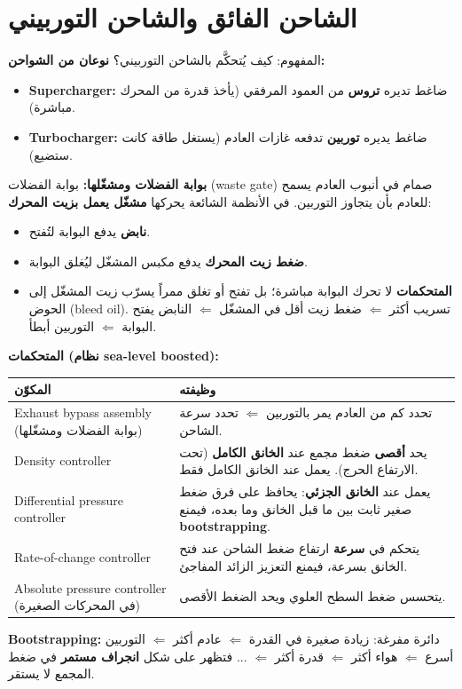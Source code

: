 \documentclass[11pt,a4paper]{article}
\newcommand{\en}[1]{\textenglish{#1}}
\begin{document}
\newpage
\section{الشاحن الفائق والشاحن التوربيني}

\begin{concept}{المفهوم: كيف يُتحكَّم بالشاحن التوربيني؟}
\textbf{نوعان من الشواحن:}
\begin{itemize}
  \item \textbf{\en{Supercharger}:} ضاغط تديره \textbf{تروس} من العمود المرفقي (يأخذ قدرة من المحرك مباشرة).
  \item \textbf{\en{Turbocharger}:} ضاغط يديره \textbf{توربين} تدفعه غازات العادم (يستغل طاقة كانت ستضيع).
\end{itemize}

\textbf{بوابة الفضلات ومشغّلها:} بوابة الفضلات (\en{waste gate}) صمام في أنبوب العادم يسمح للعادم بأن يتجاوز التوربين. في الأنظمة الشائعة يحركها \textbf{مشغّل يعمل بزيت المحرك}:
\begin{itemize}
  \item \textbf{نابض} يدفع البوابة لتُفتح.
  \item \textbf{ضغط زيت المحرك} يدفع مكبس المشغّل ليُغلق البوابة.
  \item \textbf{المتحكمات} لا تحرك البوابة مباشرة؛ بل تفتح أو تغلق ممراً يسرّب زيت المشغّل إلى الحوض (\en{bleed oil}). تسريب أكثر $\Leftarrow$ ضغط زيت أقل في المشغّل $\Leftarrow$ النابض يفتح البوابة $\Leftarrow$ التوربين أبطأ.
\end{itemize}

\textbf{المتحكمات (نظام \en{sea-level boosted}):}
\begin{center}
\begin{tabular}{|p{4.6cm}|p{9.4cm}|}
\hline
\textbf{المكوّن} & \textbf{وظيفته}\\\hline
\en{Exhaust bypass assembly} (بوابة الفضلات ومشغّلها) & تحدد كم من العادم يمر بالتوربين $\Leftarrow$ تحدد سرعة الشاحن.\\\hline
\en{Density controller} & يحد \textbf{أقصى} ضغط مجمع عند \textbf{الخانق الكامل} (تحت الارتفاع الحرج). يعمل عند الخانق الكامل فقط.\\\hline
\en{Differential pressure controller} & يعمل عند \textbf{الخانق الجزئي}: يحافظ على فرق ضغط صغير ثابت بين ما قبل الخانق وما بعده، فيمنع \textbf{\en{bootstrapping}}.\\\hline
\en{Rate-of-change controller} & يتحكم في \textbf{سرعة} ارتفاع ضغط الشاحن عند فتح الخانق بسرعة، فيمنع التعزيز الزائد المفاجئ.\\\hline
\en{Absolute pressure controller} (في المحركات الصغيرة) & يتحسس ضغط السطح العلوي ويحد الضغط الأقصى.\\\hline
\end{tabular}
\end{center}

\textbf{\en{Bootstrapping}:} دائرة مفرغة: زيادة صغيرة في القدرة $\Leftarrow$ عادم أكثر $\Leftarrow$ التوربين أسرع $\Leftarrow$ هواء أكثر $\Leftarrow$ قدرة أكثر $\Leftarrow$ ... فتظهر على شكل \textbf{انجراف مستمر} في ضغط المجمع لا يستقر.
\end{concept}
\end{document}
